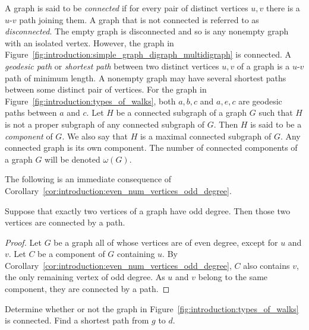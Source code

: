 A graph is said to be
\emph{connected} if for
every pair of distinct vertices $u, v$ there is a $u$-$v$ path joining
them. A graph that is not connected is referred to as
\emph{disconnected}.
The empty graph is disconnected and so is any nonempty graph with an
isolated vertex. However, the graph in
Figure~\ref{fig:introduction:simple_graph_digraph_multidigraph} is
connected. A \emph{geodesic path} or
\emph{shortest path} between two distinct
vertices $u,v$ of a graph is a $u$-$v$ path of minimum length. A
nonempty graph may have several shortest paths between some distinct
pair of vertices. For the graph in
Figure~\ref{fig:introduction:types_of_walks}, both $a,b,c$ and $a,e,c$
are geodesic paths between $a$ and $c$. Let $H$ be a connected
subgraph of a graph $G$ such that $H$ is not a proper subgraph of any
connected subgraph of $G$. Then $H$ is said to be a
\emph{component} of $G$. We also say that $H$ is a
maximal connected subgraph of $G$. Any connected graph is its own
component. The number of connected components of a graph $G$ will be
denoted $\omega(G)$\index{$\omega$}.

The following is an immediate consequence of
Corollary~\ref{cor:introduction:even_num_vertices_odd_degree}.

\begin{proposition}
Suppose that exactly two vertices of a graph have odd degree. Then
those two vertices are connected by a path.
\end{proposition}

\begin{proof}
Let $G$ be a graph all of whose vertices are of even degree, except
for $u$ and $v$. Let $C$ be a component of $G$ containing $u$. By
Corollary~\ref{cor:introduction:even_num_vertices_odd_degree}, $C$
also contains $v$, the only remaining vertex of odd degree. As $u$ and
$v$ belong to the same component, they are connected by a path.
\end{proof}

\begin{example}
Determine whether or not the graph in
Figure~\ref{fig:introduction:types_of_walks} is connected. Find a
shortest path from $g$ to $d$.
\end{example}

